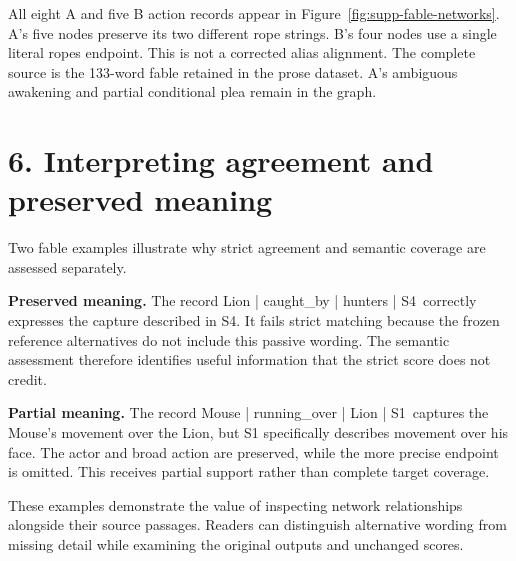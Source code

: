 \documentclass[a4paper,10pt]{article}
\newcommand{\PassiveExample}{Lion | caught\_by | hunters | S4}
\newcommand{\PartialExample}{Mouse | running\_over | Lion | S1}
\begin{document}
All eight A and five B action records appear in Figure~\ref{fig:supp-fable-networks}. A's five nodes preserve its two different rope strings. B's four nodes use a single literal ropes endpoint. This is not a corrected alias alignment. The complete source is the 133-word fable retained in the prose dataset. A's ambiguous awakening and partial conditional plea remain in the graph.


\section*{6. Interpreting agreement and preserved meaning}
\label{sec:supp-meaning}
Two fable examples illustrate why strict agreement and semantic coverage are assessed separately.

\textbf{Preserved meaning.}
The record \PassiveExample\ correctly expresses the capture described in S4. It fails strict matching because the frozen reference alternatives do not include this passive wording. The semantic assessment therefore identifies useful information that the strict score does not credit.

\textbf{Partial meaning.}
The record \PartialExample\ captures the Mouse's movement over the Lion, but S1 specifically describes movement over his face. The actor and broad action are preserved, while the more precise endpoint is omitted. This receives partial support rather than complete target coverage.

These examples demonstrate the value of inspecting network relationships alongside their source passages. Readers can distinguish alternative wording from missing detail while examining the original outputs and unchanged scores.
\end{document}
